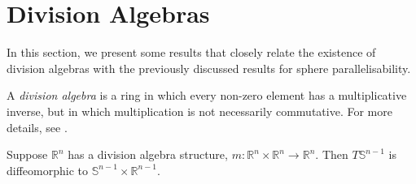 \section{Division Algebras}
In this section, we present some results that closely relate the existence of division algebras with the previously discussed results for sphere parallelisability.
\begin{definition}
A \textit{division algebra} is a ring in which every non-zero element has a multiplicative inverse, but in which multiplication is not necessarily commutative. For more details, see \cite{MR1415833}.
\end{definition}
\begin{theorem}
Suppose $\mathbb{R}^n$ has a division algebra structure, $m:\mathbb{R}^n\times\mathbb{R}^n\to\mathbb{R}^n$. Then $T\mathbb{S}^{n-1}$ is diffeomorphic to $\mathbb{S}^{n-1}\times\mathbb{R}^{n-1}$.
\end{theorem}
